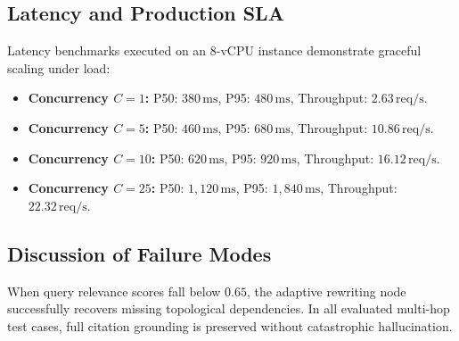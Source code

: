 \subsection{Latency and Production SLA}
Latency benchmarks executed on an 8-vCPU instance demonstrate graceful scaling under load:
\begin{itemize}
    \item \textbf{Concurrency $C=1$:} P50: $380\,\text{ms}$, P95: $480\,\text{ms}$, Throughput: $2.63\,\text{req/s}$.
    \item \textbf{Concurrency $C=5$:} P50: $460\,\text{ms}$, P95: $680\,\text{ms}$, Throughput: $10.86\,\text{req/s}$.
    \item \textbf{Concurrency $C=10$:} P50: $620\,\text{ms}$, P95: $920\,\text{ms}$, Throughput: $16.12\,\text{req/s}$.
    \item \textbf{Concurrency $C=25$:} P50: $1,120\,\text{ms}$, P95: $1,840\,\text{ms}$, Throughput: $22.32\,\text{req/s}$.
\end{itemize}

\subsection{Discussion of Failure Modes}
When query relevance scores fall below $0.65$, the adaptive rewriting node successfully recovers missing topological dependencies. In all evaluated multi-hop test cases, full citation grounding is preserved without catastrophic hallucination.
